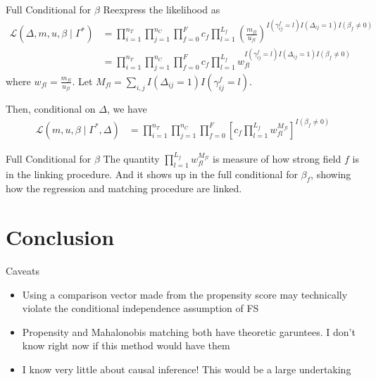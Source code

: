 \documentclass{beamer}
\begin{document}
\begin{frame}{Full Conditional for $\beta$}
	Reexpress the likelihood as
		\begin{align*}
			\mathcal{L}(\Delta, m, u, \beta \mid \Gamma^{*}) &= 
			\prod_{i=1}^{n_T}  \prod_{j=1}^{n_C}\prod_{f=0}^{F} c_f \prod_{l=1}^{L_f}\left(  \frac{m_{fl}}{u_{fl}}\right)^{I(\gamma_{ij}^f = l)I(\Delta_{ij} = 1)I(\beta_f \neq 0)} \\
			&= \prod_{i=1}^{n_T}  \prod_{j=1}^{n_C}\prod_{f=0}^{F} c_f \prod_{l=1}^{L_f}w_{fl}^{I(\gamma_{ij}^f = l)I(\Delta_{ij} = 1)I(\beta_f \neq 0)}
		\end{align*}
where $w_{fl} =  \frac{m_{fl}}{u_{fl}}$. Let $M_{fl} = \sum_{i, j} I(\Delta_{ij} = 1)I(\gamma_{ij}^f = l)$.

Then, conditional on $\Delta$, we have 
	\begin{align*}
	\mathcal{L}(m, u, \beta \mid \Gamma^{*}, \Delta) &= \prod_{i=1}^{n_T}  \prod_{j=1}^{n_C}\prod_{f=0}^{F} \left[c_f \prod_{l=1}^{L_f}w_{fl}^{M_{fl}}\right]^{I(\beta_f \neq 0)}
\end{align*}
\end{frame}

\begin{frame}{Full Conditional for $\beta$}
	The quantity $\prod_{l=1}^{L_f} w_{fl}^{M_{fl}}$ is measure of how strong field $f$ is in the linking procedure. And it shows up in the full conditional for $\beta_f$, showing how the regression and matching procedure are linked. 
\end{frame}

\section{Conclusion}

\begin{frame}{Caveats}
	\begin{itemize}
		\item Using a comparison vector made from the propensity score may technically violate the conditional independence assumption of FS
		\item Propensity and Mahalonobis matching both have theoretic garuntees. I don't know right now if this method would have them
		\item I know very little about causal inference! This would be a large undertaking
	\end{itemize}
\end{frame}
\end{document}
